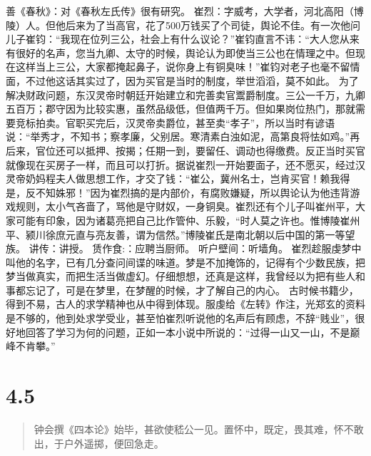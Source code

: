 \documentclass[]{book}
\begin{document}
善《春秋》：对《春秋左氏传》很有研究。
崔烈：字威考，大学者，河北高阳（博陵）人。但他后来为了当高官，花了500万钱买了个司徒，舆论不佳。有一次他问儿子崔钧：``我现在位列三公，社会上有什么议论？''崔钧直言不讳：``大人您从来有很好的名声，您当九卿、太守的时候，舆论认为即使当三公也在情理之中。但现在这样当上三公，大家都掩起鼻子，说你身上有铜臭味！''崔钧对老子也毫不留情面，不过他这话其实过了，因为买官是当时的制度，举世滔滔，莫不如此。
为了解决财政问题，东汉灵帝时朝廷开始建立和完善卖官鬻爵制度。三公一千万，九卿五百万；郡守因为比较实惠，虽然品级低，但值两千万。但如果岗位热门，那就需要竞标拍卖。官职买完后，汉灵帝卖爵位，甚至卖``孝子''，所以当时有谚语说：``举秀才，不知书；察孝廉，父别居。寒清素白浊如泥，高第良将怯如鸡。''再后来，官位还可以抵押、按揭；任期一到，要留任、调动也得缴费。反正当时买官就像现在买房子一样，而且可以打折。据说崔烈一开始要面子，还不愿买，经过汉灵帝奶妈程夫人做思想工作，才交了钱：``崔公，冀州名士，岂肯买官！赖我得是，反不知姝邪！''因为崔烈搞的是内部价，有腐败嫌疑，所以舆论认为他违背游戏规则，太小气吝啬了，骂他是守财奴，一身铜臭。崔烈还有个儿子叫崔州平，大家可能有印象，因为诸葛亮把自己比作管仲、乐毅，``时人莫之许也。惟博陵崔州平、颍川徐庶元直与亮友善，谓为信然。''博陵崔氏是南北朝以后中国的第一等望族。
讲传：讲授。 赁作食:：应聘当厨师。 听户壁间：听墙角。
崔烈趁服虔梦中叫他的名字，已有几分查问间谍的味道。梦是不加掩饰的，记得有个少数民族，把梦当做真实，而把生活当做虚幻。仔细想想，还真是这样，我曾经以为把有些人和事都忘记了，可是在梦里，在梦醒的时候，才了解自己的内心。
古时候书籍少，得到不易，古人的求学精神也从中得到体现。服虔给《左转》作注，光郑玄的资料是不够的，他到处求学受业，甚至怕崔烈听说他的名声后有顾虑，不辞``贱业''，很好地回答了学习为何的问题，正如一本小说中所说的：``过得一山又一山，不是巅峰不肯攀。''

\section{4.5}\label{section-185}

\begin{quote}
钟会撰《四本论》始毕，甚欲使嵇公一见。置怀中，既定，畏其难，怀不敢出，于户外遥掷，便回急走。
\end{quote}
\end{document}
